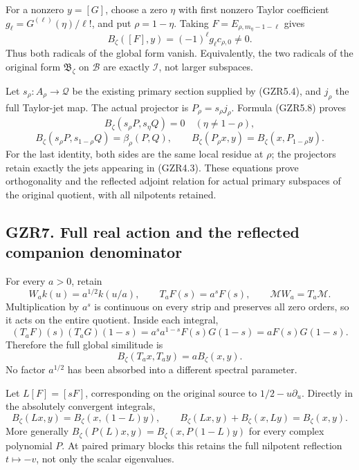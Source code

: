 For a nonzero \(y=[G]\), choose a zero \(\eta\) with first nonzero
Taylor coefficient \(g_\ell=G^{(\ell)}(\eta)/\ell!\), and put
\(\rho=1-\eta\). Taking \(F=E_{\rho,m_\eta-1-\ell}\) gives \[
B_\zeta([F],y)=(-1)^\ell g_\ell c_{\rho,0}\ne0.
\tag{GZR6.2}
\] Thus both radicals of the global form vanish. Equivalently, the two
radicals of the original form \(\mathfrak B_\zeta\) on \(\mathcal B\)
are exactly \(\mathcal I\), not larger subspaces.

Let \(s_\rho:A_\rho\to\mathcal Q\) be the existing primary section
supplied by (GZR5.4), and \(j_\rho\) the full Taylor-jet map. The actual
projector is \(P_\rho=s_\rho j_\rho\). Formula (GZR5.8) proves \[
B_\zeta(s_\rho P,s_\eta Q)=0\quad(\eta\ne1-\rho),
\] \[
B_\zeta(s_\rho P,s_{1-\rho}Q)=\beta_\rho(P,Q),
\qquad
B_\zeta(P_\rho x,y)=B_\zeta(x,P_{1-\rho}y).
\tag{GZR6.3}
\] For the last identity, both sides are the same local residue at
\(\rho\); the projectors retain exactly the jets appearing in (GZR4.3).
These equations prove orthogonality and the reflected adjoint relation
for actual primary subspaces of the original quotient, with all
nilpotents retained.

\subsection{GZR7. Full real action and the reflected companion
denominator}\label{gzr7.-full-real-action-and-the-reflected-companion-denominator}

For every \(a>0\), retain \[
W_ak(u)=a^{1/2}k(u/a),\qquad
T_aF(s)=a^sF(s),\qquad
\mathcal MW_a=T_a\mathcal M.
\tag{GZR7.1}
\] Multiplication by \(a^s\) is continuous on every strip and preserves
all zero orders, so it acts on the entire quotient. Inside each
integral, \[
(T_aF)(s)(T_aG)(1-s)
=a^sa^{1-s}F(s)G(1-s)=aF(s)G(1-s).
\] Therefore the full global similitude is \[
B_\zeta(T_ax,T_ay)=a B_\zeta(x,y).
\tag{GZR7.2}
\] No factor \(a^{1/2}\) has been absorbed into a different spectral
parameter.

Let \(L[F]=[sF]\), corresponding on the original source to
\(1/2-u\partial_u\). Directly in the absolutely convergent integrals, \[
B_\zeta(Lx,y)=B_\zeta(x,(1-L)y),\qquad
B_\zeta(Lx,y)+B_\zeta(x,Ly)=B_\zeta(x,y).
\tag{GZR7.3}
\] More generally \(B_\zeta(P(L)x,y)=B_\zeta(x,P(1-L)y)\) for every
complex polynomial \(P\). At paired primary blocks this retains the full
nilpotent reflection \(t\mapsto-v\), not only the scalar eigenvalues.

